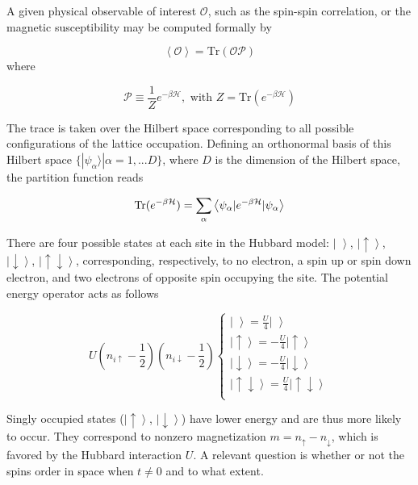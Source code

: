 A given physical observable of interest $\mathcal{O}$, such as the spin-spin correlation, or the magnetic susceptibility may be computed formally by

\begin{equation}
\left\langle \mathcal{O} \right\rangle = \text{Tr} ( \mathcal{O} \mathcal{P} )
\end{equation}
where

\begin{equation}\label{eq:projection}
\mathcal{P} \equiv \frac{1}{Z} e^{-\beta \mathcal{H} } , \text{ with } Z = \text{Tr} ( e^{-\beta \mathcal{H} } )
\end{equation}

The trace is taken over the Hilbert space corresponding to all possible configurations of the lattice occupation. Defining an orthonormal basis of this Hilbert space $\{ | \psi_\alpha \rangle | \alpha = 1, ... D \} $, where $D$ is the dimension of the Hilbert space, the partition function reads

\begin{equation}\label{eq:z_asEigen}
\operatorname{Tr} ( e^{-\beta \mathcal{H} } )= \sum_\alpha \left\langle \psi_\alpha | e^{-\beta \mathcal{H} } | \psi_\alpha \right\rangle
\end{equation}

There are four possible states at each site in the Hubbard model: $\left| \,\, \right\rangle$, $\left|\uparrow \right\rangle$, $\left|\downarrow\right \rangle$, $\left|\uparrow \downarrow \right\rangle $, corresponding, respectively, to no electron, a spin up or spin down electron, and two electrons of opposite spin occupying the site. The potential energy operator acts as follows

\begin{equation}
U (n_{i\uparrow} - \frac{1}{2} ) ( n_{i\downarrow} - \frac{1}{2} ) 
\begin{cases}
\left| \,\, \right\rangle = \frac{U}{4} \left| \,\, \right\rangle \\
\left|\uparrow \right\rangle = -\frac{U}{4} \left|\uparrow \right\rangle \\
\left|\downarrow\right \rangle = -\frac{U}{4} \left|\downarrow\right \rangle \\
\left|\uparrow \downarrow \right\rangle = \frac{U}{4} \left|\uparrow \downarrow \right\rangle \\
\end{cases}
\end{equation}

Singly occupied states ($\left|\uparrow \right\rangle$, $\left|\downarrow\right \rangle$) have lower energy and are thus more likely to occur. They correspond to nonzero magnetization $m = n_{\uparrow} - n_{\downarrow}$, which is favored by the Hubbard interaction $U$. A relevant question is whether or not the spins order in space when $t \neq 0$ and to what extent.


